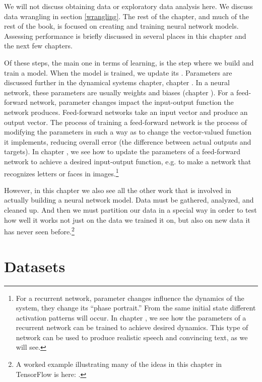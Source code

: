 We will not discuss obtaining data or exploratory data analysis here. We discuss data wrangling in section \ref{wrangling}. The rest of the chapter, and much of the rest of the book, is focused on creating and training neural network models. Assessing performance is briefly discussed in several places in this chapter and the next few chapters.

Of these steps, the main one in terms of learning, is the step where we build and train a model. When the model is trained, we update its . Parameters are discussed further in the dynamical systems chapter, chapter . In a neural network, these parameters are usually weights and biases (chapter ). For a feed-forward network, parameter changes impact the input-output function the network produces. Feed-forward networks take an input vector and produce an output vector. The process of training a feed-forward network is the process of modifying the parameters in such  a way as to change the vector-valued function it implements, reducing overall error (the difference between actual outputs and targets). In chapter , we see how to update the parameters of a feed-forward network to achieve a desired input-output function, e.g. to make a network that recognizes letters or faces in images.\footnote{For a recurrent network, parameter changes influence the dynamics of the system, they change its ``phase portrait.'' From the same initial state different activation patterns will occur. In chapter , we see how the parameters of a recurrent network can be trained to achieve desired dynamics. This type of network can be used to produce realistic speech and convincing text, as we will see.}

However, in this chapter we also see all the other work that is involved in actually building a neural network model. Data must be gathered, analyzed, and cleaned up. And then we must partition our data in a special way in order to test how well it works not just on the data we trained it on, but also on new data it has never seen before.\footnote{A worked example illustrating many of the ideas in this chapter in TensorFlow is here: .}

\section{Datasets}

